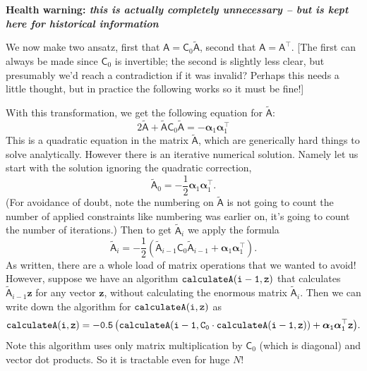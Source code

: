 \documentclass[11pt,a4paper,preprint]{aastex}
\newcommand{\bmath}[1]{\ensuremath{\bm{#1}}}
\renewcommand{\vec}[1]{\bmath{#1}}
\begin{document}
{\bf Health warning: \it this is actually completely unnecessary -- but is kept here for
  historical information}

 We now make two ansatz, first that
$\mathsf{A} = \mathsf{C}_0 \tilde{\mathsf{A}}$, second that $\mathsf{A} =
\mathsf{A}^{\top}$. [The first can always be made since $\mathsf{C}_0$
is invertible; the second is slightly less clear, but presumably we'd
reach a contradiction if it was invalid? Perhaps this needs a little
thought, but in practice the following works so it must be fine!]

With this transformation, we get the following equation for $\tilde{\mathsf{A}}$:
\begin{equation}
2 \tilde{\mathsf{A}} + \tilde{\mathsf{A}} \mathsf{C}_0
\tilde{\mathsf{A}} = - \vec{\alpha}_1 \vec{\alpha}_1^{\top}  
\end{equation}
This is a quadratic equation in the matrix $\tilde{\mathsf{A}}$, which
are generically hard things to solve analytically. However there is an
iterative numerical solution. Namely let us start with the solution
ignoring the quadratic correction,
\begin{equation}
\tilde{\mathsf{A}}_0 = -\frac{1}{2} \vec{\alpha}_1 \vec{\alpha}_1^{\top}\textrm{.}
\end{equation}
(For avoidance of doubt, note the numbering on $\tilde{\mathsf{A}}$ is
not going to count the number of applied constraints like numbering
was earlier on, it's going to count the number of iterations.) Then to
get $\tilde{\mathsf{A}}_{i}$ we apply the formula
\begin{equation}
\tilde{\mathsf{A}}_{i} = -\frac{1}{2} \left(\tilde{\mathsf{A}}_{i-1}
  \mathsf{C}_0 \tilde{\mathsf{A}}_{i-1} + \vec{\alpha}_1 \vec{\alpha}_1^{\top} \right)\textrm{.}
\end{equation}
As written, there are a whole load of matrix operations that we wanted
to avoid! However, suppose we have an algorithm ${\tt calculateA(i-1,z)}$
that calculates $\tilde{\mathsf{A}}_{i-1} \vec{z}$ for any vector
$\vec{z}$, without calculating the enormous matrix
$\tilde{\mathsf{A}}_i$. Then we can write down the algorithm for ${\tt
  calculateA(i,z)}$ as
\begin{equation}
{\tt calculateA(i,z) = -0.5 \left(calculateA(i-1, C_0 \cdot calculateA(i-1,
  z)) + \vec{\alpha}_1 \vec{\alpha}_1^{\top} \vec{z} \right)}\textrm{.}
\end{equation}
Note this algorithm uses only matrix multiplication by $\mathsf{C}_0$
(which is diagonal) and vector dot products. So it is tractable even
for huge $N$! 
\end{document}
